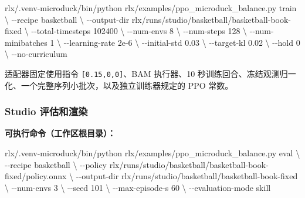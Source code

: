 \documentclass[
  chinese,
  11pt,
  letterpaper,
]{article}
\newenvironment{Shaded}{\begin{snugshade}}{\end{snugshade}}
\newcommand{\AttributeTok}[1]{\textcolor[rgb]{0.13,0.29,0.53}{#1}}
\newcommand{\DataTypeTok}[1]{\textcolor[rgb]{0.13,0.29,0.53}{#1}}
\newcommand{\ExtensionTok}[1]{#1}
\newcommand{\NormalTok}[1]{#1}
\renewenvironment{Shaded}{\par\smallskip}{\par\smallskip}
\begin{document}
\begin{Shaded}
\begin{Highlighting}[]
\ExtensionTok{rlx/.venv{-}microduck/bin/python}\NormalTok{ rlx/examples/ppo\_microduck\_balance.py train }\DataTypeTok{\textbackslash{}}
  \AttributeTok{{-}{-}recipe}\NormalTok{ basketball }\DataTypeTok{\textbackslash{}}
  \AttributeTok{{-}{-}output{-}dir}\NormalTok{ rlx/runs/studio/basketball/basketball{-}book{-}fixed }\DataTypeTok{\textbackslash{}}
  \AttributeTok{{-}{-}total{-}timesteps}\NormalTok{ 102400 }\DataTypeTok{\textbackslash{}}
  \AttributeTok{{-}{-}num{-}envs}\NormalTok{ 8 }\DataTypeTok{\textbackslash{}}
  \AttributeTok{{-}{-}num{-}steps}\NormalTok{ 128 }\DataTypeTok{\textbackslash{}}
  \AttributeTok{{-}{-}num{-}minibatches}\NormalTok{ 1 }\DataTypeTok{\textbackslash{}}
  \AttributeTok{{-}{-}learning{-}rate}\NormalTok{ 2e{-}6 }\DataTypeTok{\textbackslash{}}
  \AttributeTok{{-}{-}initial{-}std}\NormalTok{ 0.03 }\DataTypeTok{\textbackslash{}}
  \AttributeTok{{-}{-}target{-}kl}\NormalTok{ 0.02 }\DataTypeTok{\textbackslash{}}
  \AttributeTok{{-}{-}hold}\NormalTok{ 0 }\DataTypeTok{\textbackslash{}}
  \AttributeTok{{-}{-}no{-}curriculum}
\end{Highlighting}
\end{Shaded}

适配器固定使用指令 \texttt{{[}0.15,0,0{]}}、BAM 执行器、10
秒训练回合、冻结观测归一化、一个完整序列小批次，以及独立训练器规定的 PPO
常数。

\subsubsection{Studio
评估和渲染}\label{studio-ux8bc4ux4f30ux548cux6e32ux67d3}

\textbf{可执行命令（工作区根目录）：}

\begin{Shaded}
\begin{Highlighting}[]
\ExtensionTok{rlx/.venv{-}microduck/bin/python}\NormalTok{ rlx/examples/ppo\_microduck\_balance.py eval }\DataTypeTok{\textbackslash{}}
  \AttributeTok{{-}{-}recipe}\NormalTok{ basketball }\DataTypeTok{\textbackslash{}}
  \AttributeTok{{-}{-}policy}\NormalTok{ rlx/runs/studio/basketball/basketball{-}book{-}fixed/policy.onnx }\DataTypeTok{\textbackslash{}}
  \AttributeTok{{-}{-}output{-}dir}\NormalTok{ rlx/runs/studio/basketball/basketball{-}book{-}fixed }\DataTypeTok{\textbackslash{}}
  \AttributeTok{{-}{-}num{-}envs}\NormalTok{ 3 }\DataTypeTok{\textbackslash{}}
  \AttributeTok{{-}{-}seed}\NormalTok{ 101 }\DataTypeTok{\textbackslash{}}
  \AttributeTok{{-}{-}max{-}episode{-}s}\NormalTok{ 60 }\DataTypeTok{\textbackslash{}}
  \AttributeTok{{-}{-}evaluation{-}mode}\NormalTok{ skill}
\end{Highlighting}
\end{Shaded}
\end{document}
